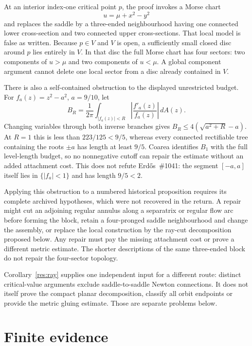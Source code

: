 At an interior index-one critical point $p$, the proof invokes a Morse chart
\[
 u=\mu+x^2-y^2
\]
and replaces the saddle by a three-ended neighbourhood having one connected
lower cross-section and two connected upper cross-sections.  That local model
is false as written.  Because $p\in V$ and $V$ is open, a sufficiently small
closed disc around $p$ lies entirely in $V$.  In that disc the full Morse chart
has four sectors: two components of $u>\mu$ and two components of $u<\mu$.
A global component argument cannot delete one local sector from a disc already
contained in $V$.

There is also a self-contained obstruction to the displayed unrestricted
budget.  For $f_a(z)=z^2-a^2$, $a=9/10$, let
\[
 B_R=\frac1{2\pi}\int_{|f_a(z)|<R}\left|\frac{f'_a(z)}{f_a(z)}\right|\,dA(z).
\]
Changing variables through both inverse branches gives
$B_R\le4(\sqrt{a^2+R}-a)$.  At $R=1$ this is less than
$223/125<9/5$, whereas every connected rectifiable tree containing the roots
$\pm a$ has length at least $9/5$.  Coarea identifies $B_1$ with the full
level-length budget, so no nonnegative cutoff can repair the estimate without
an added attachment cost.  This does not refute Erd\H{o}s~\#1041: the segment
$[-a,a]$ itself lies in $\{|f_a|<1\}$ and has length $9/5<2$.

Applying this obstruction to a numbered historical proposition requires its
complete archived hypotheses, which were not recovered in the return.  A
repair might cut an adjoining regular annulus along a separatrix or regular
flow arc before forming the block, retain a four-pronged saddle neighbourhood
and change the assembly, or replace the local construction by the ray-cut
decomposition proposed below.  Any repair must pay the missing attachment
cost or prove a different metric estimate.
The shorter descriptions of the same three-ended block do not repair the
four-sector topology.

Corollary~\ref{res:ray} supplies one independent input for a different route:
distinct critical-value arguments exclude saddle-to-saddle Newton
connections.  It does not itself prove the compact planar decomposition,
classify all orbit endpoints or provide the metric gluing estimate.  Those are
separate problems below.

\section{Finite evidence}\label{sec:finite}

